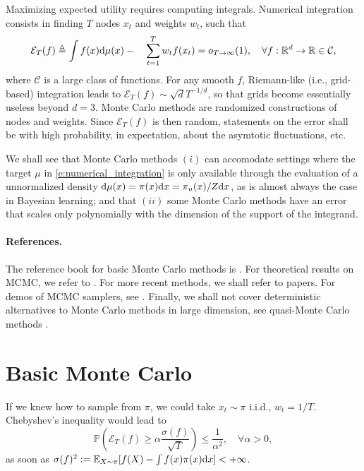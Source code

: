 
Maximizing expected utility requires computing integrals. 
Numerical integration consists in finding $T$ nodes $x_t$ and weights $w_t$, such
that
$$
    {\mathcal{E}_T(f)} \triangleq  \int f(x)\mathrm{d}\mu(x)  - \quad \sum_{t=1}^T w_t f(x_t) = o_{T\rightarrow \infty}(1), \quad \forall
    f:\mathbb{R}^d\rightarrow\mathbb{R}\in\mathcal C,
$$
where $\mathcal C$ is a large class of functions.
For any smooth $f$, Riemann-like (i.e., grid-based) integration leads to $\mathcal{E}_T(f) \sim \sqrt{d} T^{-1/d}$, so that grids become essentially useless beyond $d=3$.
Monte Carlo methods are randomized constructions of nodes and weights. 
Since $\mathcal{E}_T(f)$ is then random, statements on the error shall be with high probability, in expectation, about the asymtotic fluctuations, etc.

We shall see that Monte Carlo methods $(i)$ can accomodate settings where the target $\mu$ in \eqref{e:numerical_integration} is only available through the evaluation of a unnormalized density $\mathrm{d}\mu(x) = \pi(x)\mathrm{d} x = \pi_u(x)/Z\mathrm{d} x$, as is almost always the case in Bayesian learning; and that $(ii)$ some Monte Carlo methods have an error that scales only polynomially with the dimension of the support of the integrand.

\paragraph{References.} 
The reference book for basic Monte Carlo methods is \citep{RoCa04}. 
For theoretical results on MCMC, we refer to \citep[Chapters 5 to 7]{DoMoSt14}. 
For more recent methods, we shall refer to papers.
For demos of MCMC samplers, see \cfdemo.
Finally, we shall not cover deterministic alternatives to Monte Carlo methods in large dimension, see quasi-Monte Carlo methods \citep{DiPi10}.

\section{Basic Monte Carlo}

If we knew how to sample from $\pi$, we could take $x_t\sim\pi$ i.i.d., $w_t=1/T$.
Chebyshev's inequality would lead to
  $$ \mathbb{P}\left({\mathcal{E}_T(f)} \geq \alpha\frac{\sigma(f)}{\sqrt{T}} \right) \leq \frac{1}{\alpha^2}, \quad \forall \alpha>0,$$
  as soon as $\sigma(f)^2 := \mathbb{E}_{X\sim\pi} [f(X) - \int f(x)\pi(x)\mathrm{d} x]<+\infty$.

